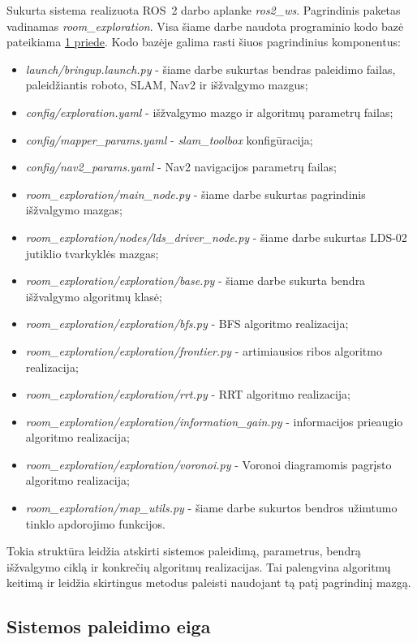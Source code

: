 \documentclass[]{VUMIFTemplateClass}
\begin{document}
Sukurta sistema realizuota ROS~2 darbo aplanke \textit{ros2\_ws}. Pagrindinis paketas vadinamas \textit{room\_exploration}. Visa šiame darbe naudota
programinio kodo bazė pateikiama \hyperref[priedas:kodo-saugykla]{1 priede}. Kodo bazėje galima rasti šiuos pagrindinius komponentus:
\begin{itemize}
  \item \textit{launch/bringup.launch.py} - šiame darbe sukurtas bendras paleidimo failas, paleidžiantis roboto, SLAM, Nav2 ir išžvalgymo mazgus;
  \item \textit{config/exploration.yaml} - išžvalgymo mazgo ir algoritmų parametrų failas;
  \item \textit{config/mapper\_params.yaml} - \textit{slam\_toolbox} konfigūracija;
  \item \textit{config/nav2\_params.yaml} - Nav2 navigacijos parametrų failas;
  \item \textit{room\_exploration/main\_node.py} - šiame darbe sukurtas pagrindinis išžvalgymo mazgas;
  \item \textit{room\_exploration/nodes/lds\_driver\_node.py} - šiame darbe sukurtas LDS-02 jutiklio tvarkyklės mazgas;
  \item \textit{room\_exploration/exploration/base.py} - šiame darbe sukurta bendra išžvalgymo algoritmų klasė;
  \item \textit{room\_exploration/exploration/bfs.py} - BFS algoritmo realizacija;
  \item \textit{room\_exploration/exploration/frontier.py} - artimiausios ribos algoritmo realizacija;
  \item \textit{room\_exploration/exploration/rrt.py} - RRT algoritmo realizacija;
  \item \textit{room\_exploration/exploration/information\_gain.py} - informacijos prieaugio algoritmo realizacija;
  \item \textit{room\_exploration/exploration/voronoi.py} - Voronoi diagramomis pagrįsto algoritmo realizacija;
  \item \textit{room\_exploration/map\_utils.py} - šiame darbe sukurtos bendros užimtumo tinklo apdorojimo funkcijos.
\end{itemize}

Tokia struktūra leidžia atskirti sistemos paleidimą, parametrus, bendrą išžvalgymo ciklą ir konkrečių algoritmų realizacijas. Tai palengvina algoritmų keitimą
ir leidžia skirtingus metodus paleisti naudojant tą patį pagrindinį mazgą.

\subsection{Sistemos paleidimo eiga}
\end{document}
